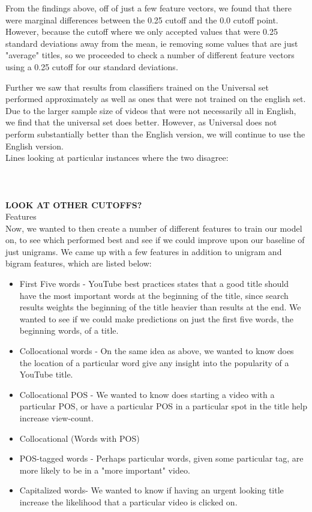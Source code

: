 \documentclass[a4paper,12pt]{article}
\begin{document}
From the findings above, off of just a few feature vectors, we found that there were marginal differences between the 0.25 cutoff and the 0.0 cutoff point. However, because the cutoff where we only accepted values that were 0.25 standard deviations away from the mean, ie removing some values that are just "average" titles, so we proceeded to check a number of different feature vectors using a 0.25 cutoff for our standard deviations. 

Further we saw that results from classifiers trained on the Universal set performed approximately as well as ones that were not trained on the english set. Due to the larger sample size of videos that were not necessarily all in English, we find that the universal set does better. However, as Universal does not perform substantially better than the English version, we will continue to use the English version.\\


Lines looking at particular instances where the two disagree:\\
\\
\\
\\

\textbf{LOOK AT OTHER CUTOFFS?} \\



Features\\

Now, we wanted to then create a number of different features to train our model on, to see which performed best and see if we could improve upon our baseline of just unigrams. We came up with a few features in addition to unigram and bigram features, which are listed below: 
\begin{itemize}
    \item First Five words - YouTube best practices states that a good title should have the most important words at the beginning of the title, since search results weights the beginning of the title heavier than results at the end. We wanted to see if we could make predictions on just the first five words, the beginning words, of a title.
  \item Collocational words - On the same idea as above, we wanted to know does the location of a particular word give any insight into the popularity of a YouTube title.
  \item Collocational POS - We wanted to know does starting a video with a particular POS, or have a particular POS in a particular spot in the title help increase view-count.
  \item Collocational (Words with POS)
  \item POS-tagged words - Perhaps particular words, given some particular tag, are more likely to be in a "more important" video.
  \item Capitalized words- We wanted to know if having an urgent looking title increase the likelihood that a particular video is clicked on.
\end{itemize}
\end{document}
